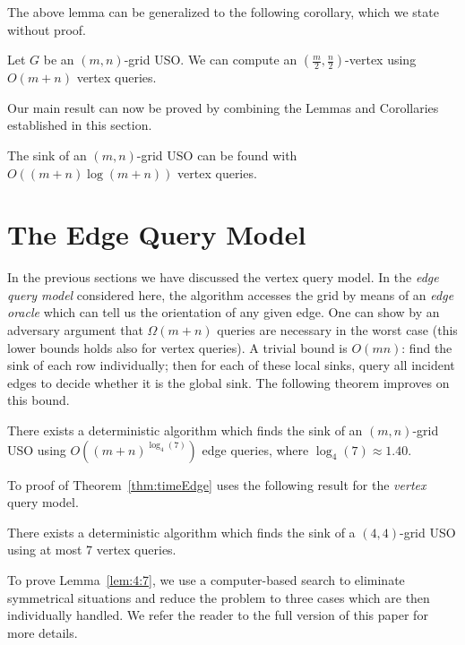 \documentclass[runningheads,a4paper]{llncs}
\begin{document}
The above lemma can be generalized to the following corollary, which we state without proof. 
\begin{corollary}\label{corollary: (m/2,n/2) indegree}
Let $G$ be an $(m,n)$-grid USO. 
We can compute an $( \frac{m}{2}, \frac{n}{2})$-vertex using $O(m + n)$ vertex queries.
\end{corollary}

Our main result can now be proved by combining the Lemmas and Corollaries established in this section. 

\begin{theorem}\label{theorem:Sink algorithm}
The sink of an $(m,n)$-grid USO can be found with \\ $O((m+n)\log (m+n))$ vertex queries.
\end{theorem}

\section{The Edge Query Model}
\label{section:The edge query model}

In the previous sections we have discussed the vertex query model.
In the \emph{edge query model} considered here, the algorithm accesses the
grid by means of an \emph{edge oracle} which can tell us
the orientation of any given edge.
One can show by an adversary argument that $\Omega(m+n)$ queries are necessary in the worst case (this lower bounds holds also for vertex queries).
A trivial bound is $O(mn)$: find the sink of each row individually; then
for each of these local sinks, query all incident edges to decide whether it
is the global sink.
The following theorem improves on this bound.

\begin{theorem}
    \label{thm:timeEdge}
    There exists a deterministic algorithm which finds the sink of an $(m,n)$-grid USO using $O((m+n) ^ {\log_4(7)})$ edge queries, where $\log_4(7) \approx
    1.40$.
\end{theorem}

To proof of Theorem~\ref{thm:timeEdge} uses the following result for the \emph{vertex} query model.

\begin{lemma}
    \label{lem:4:7}
    There exists a deterministic algorithm which finds the sink of a\linebreak
    $(4,4)$-grid USO using at most 7 vertex queries.
\end{lemma}
To prove Lemma~\ref{lem:4:7}, we use a computer-based search to eliminate symmetrical situations and reduce the problem to three cases which are then individually handled.
We refer the reader to the full version of this paper for more details.
\end{document}
